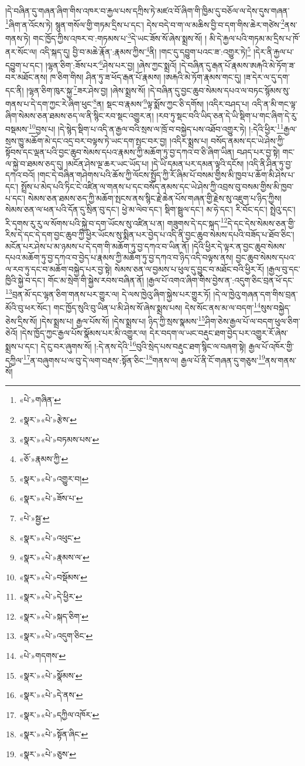 །དེ་བཞིན་དུ་གཞན་ཞིག་གིས་འཁར་བ་རྐྱལ་པས་དཀྲིས་ཏེ་མཛའ་བོ་ཞིག་གི་ཁྱིམ་དུ་བཅོལ་ལ་དེས་དུས་གཞན་\footnote{«པེ་»གཞིན་}ཞིག་ན་འོངས་ཏེ། སྙུན་གསོལ་གྱི་གཏམ་དྲིས་པ་དང་། དེས་བདེ་བ་ག་ལ་མཆིས་བྱི་བ་དག་གིས་ཆེར་གཙེས་\footnote{«སྣར་»«པེ་»རྩེས་}ནས་གནས་ཏེ། གང་ཁྱོད་ཀྱིས་འཁར་བ་:གཏམས་པ་\footnote{«སྣར་»«པེ་»བཏམས་པས་}དེ་ཡང་ཟོས་སོ་ཞེས་སྨྲས་སོ། །
མི་དེ་རྐྱལ་པའི་གཏམ་མ་དྲིས་པ་ཁོ་ནར་སོང་ལ། འདི་སྐད་དུ། བྱི་བ་མཆེ་རྣོན་:རྣམས་ཀྱིས་\footnote{«ཅོ་»རྣམས་ཀྱི་}ནི། །གང་དུ་དབྱུག་པའང་ཟ་:འགྱུར་ཏེ།\footnote{«སྣར་»«པེ་»འགྱུར་བ།} །དེར་ནི་རྐྱལ་པ་དབྱུག་པ་དང་། །ལྷན་ཅིག་:ཟོས་པར་\footnote{«སྣར་»«པེ་»ཟོས་པ་}ཤེས་པར་བྱ། །ཞེས་ཀྱང་སྨྲའོ། །དེ་བཞིན་དུ་རྒན་པོ་རྣམས་ཨརྐའི་མེ་ཏོག་ཟ་བར་མཐོང་ནས། ཁ་ཅིག་གིས། ཤིན་ཏུ་ཟ་ཕོད་རྒན་པོ་རྣམས། །ཨརྐའི་མེ་ཏོག་རྣམས་གང་དུ། །ཟ་དེར་ལ་དུ་དག་དང་ནི། །ལྷན་ཅིག་ཁུར་སྐྱ་\footnote{«པེ་»སྦྱ་}ཟར་ཤེས་བྱ། །ཞེས་སྨྲས་སོ། །དེ་བཞིན་དུ་བྱང་ཆུབ་སེམས་དཔའ་ལ་བཏང་སྙོམས་སུ་གནས་པ་དེ་དག་ཀྱང་རེ་ཞིག་ཕུང་\footnote{«སྣར་»«པེ་»འཕུང་}ན། སྡང་བ་རྣམས་\footnote{«སྣར་»«པེ་»རྣམས་ལ་}ལྟ་སྨོས་ཀྱང་ཅི་དགོས། །འདིར་བཤད་པ། འདི་ན་མི་གང་ལྟ་ཞིག་སེམས་ཅན་ཐམས་ཅད་ལ་ནི་སྙིང་རབ་སྡང་འགྱུར་ན། །རབ་ཏུ་སྡང་བའི་ཡིད་ཅན་དེ་ཡི་སྡིག་པ་གང་ཞིག་དེ་རུ་བསྡམས་\footnote{«སྣར་»«པེ་»བསྡོམས་}བྱས་པ། །དེ་སྙེད་སྡིག་པ་འདི་ན་རྒྱལ་བའི་སྲས་ལ་ཁྲོ་བ་བསྐྱེད་པས་འཐོབ་འགྱུར་ཏེ། །:དེའི་ཕྱིར་\footnote{«སྣར་»«པེ་»དེ་ཕྱིར་}རྒྱལ་སྲས་ཁྱུ་མཆོག་མེ་དང་འདྲ་བར་བལྟས་ཏེ་ཡང་དག་སྤང་བར་བྱ། །འདིར་སྨྲས་པ། བསོད་ནམས་དང་ཡེ་ཤེས་ཀྱི་སྟོབས་དང་ལྡན་པའི་བྱང་ཆུབ་སེམས་དཔའ་རྣམས་ཀྱི་མཆོག་ཏུ་བྱ་དཀའ་བ་ཅི་ཞིག་ཡིན། བཤད་པར་བྱ་སྟེ། གང་ལ་སྐྱེ་བ་ཐམས་ཅད་དུ། །མངོན་ཤེས་ལྔ་ཆར་ཡང་ཡོད་པ། །དེ་ཡི་དམན་པར་དམན་ལྟའི་དངོས། །འདི་ནི་ཤིན་ཏུ་བྱ་དཀའ་བའོ། །གང་དེ་བཞིན་གཤེགས་པའི་ཆོས་ཀྱི་ལོངས་སྤྱོད་ཀྱི་རོ་ཞིམ་པོ་བསམ་གྱིས་མི་ཁྱབ་པ་ཆོག་མི་ཤེས་པ་དང་། སྤྲོས་པ་མེད་པའི་ཏིང་ངེ་འཛིན་ལ་གནས་པ་དང་བསོད་ནམས་དང་ཡེ་ཤེས་ཀྱི་འབྲས་བུ་བསམ་གྱིས་མི་ཁྱབ་པ་དང་། སེམས་ཅན་ཐམས་ཅད་ཀྱི་མཆོག་སྤངས་ནས་སྙིང་རྗེ་ཆེན་པོས་གཞན་གྱི་རྗེས་སུ་འཇུག་པ་ཉིད་ཀྱིས། སེམས་ཅན་ལ་ཕན་པའི་དོན་དུ་སྲིན་བུ་དང་། ཕྱེ་མ་ལེབ་དང་། སྡིག་སྦྲུལ་དང་། མ་ཧེ་དང་། རི་བོང་དང་། སྤྲེའུ་དང་། རི་དྭགས་རུ་རུ་ལ་སོགས་པའི་སྐྱེ་བ་དག་ཡོངས་སུ་འཛིན་པ་ན། གཟུགས་དེ་དང་སྐད་\footnote{«སྣར་»«པེ་»སྐད་ཅིག་}དེ་དང་དེས་སེམས་ཅན་གྱི་རིས་དེ་དང་དེ་དག་བྱང་ཆུབ་ཀྱི་ཕྱིར་ཡོངས་སུ་སྨིན་པར་བྱེད་པ་འདི་ནི་བྱང་ཆུབ་སེམས་དཔའི་བཟོད་པ་ཐོབ་ཅིང་། མངོན་པར་ཤེས་པ་མ་ཉམས་པ་དེ་དག་གི་མཆོག་ཏུ་བྱ་དཀའ་བ་ཡིན་ནོ། །དེའི་ཕྱིར་དེ་ལྟར་ན་བྱང་ཆུབ་སེམས་དཔའ་མཆོག་ཏུ་བྱ་དཀའ་བ་བྱེད་པ་རྣམས་ཀྱི་མཆོག་ཏུ་བྱ་དཀའ་བ་ཉིད་འདི་བལྟས་ནས། བྱང་ཆུབ་སེམས་དཔའ་ལ་རབ་ཏུ་དང་བ་མཆོག་བསྐྱེད་པར་བྱ་སྟེ། སེམས་ཅན་ལ་བྱམས་པ་ཕུལ་དུ་བྱུང་བ་མཐོང་བའི་ཕྱིར་རོ། །རྒྱལ་བུ་དང་ཁྱིའི་སྐྱེ་བ་དང་། གོང་མ་སྲེག་གི་སྐྱེས་རབས་བཞིན་ནོ། །རྒྱལ་པོ་འགའ་ཞིག་གིས་བྱེས་ན་:འདུག་ཅིང་བྲན་ཕོ་དང་\footnote{«སྣར་»«པེ་»འདུག་ཅིང་}བྲན་མོ་དང་ལྷན་ཅིག་གནས་པར་གྱུར་ལ། དེ་ལས་ཁྱེའུ་ཞིག་སྐྱེས་པར་གྱུར་ཏོ། །དེ་ལ་ཁྱེའུ་གཞན་དག་གིས་བྲན་མོའི་བུ་ཕར་སོང་། གང་ཁྱོད་སུའི་བུ་ཡིན་པ་མི་ཤེས་སོ་ཞེས་སྨྲས་པས། དེས་སོང་ནས་མ་ལ་བདག་\footnote{«པེ་»གདགས་}སུས་བསྐྱེད་ཅེས་དྲིས་སོ། །དེས་སྨྲས་པ། རྒྱལ་པོས་སོ། །དེས་སྨྲས་པ། ཉིད་ཀྱི་སྲས་སྣམས་\footnote{«སྣར་»«པེ་»སྣོམས་}ཤིག་ཅེས་རྒྱལ་པོ་ལ་བདག་ཕུལ་ཅིག་ཅེའོ། །དེས་ཁྱོད་ཀྱང་རྒྱལ་པོས་སྣོམས་པར་མི་འགྱུར་ལ། དེར་བདག་ལ་ཡང་བརྡུང་ཐག་བྱེད་པར་འགྱུར་རོ་ཞེས་སྨྲས་པ་དང་། དེ་ངུ་བར་ཞུགས་སོ། །:དེ་ནས་དེའི་\footnote{«སྣར་»«པེ་»དེ་ནས་}བུའི་སྲེད་པས་བརྡུང་ཐག་སྙིང་ལ་བཞག་སྟེ། རྒྱལ་པོ་འཁོར་གྱི་དཀྱིལ་\footnote{«སྣར་»«པེ་»དཀྱིལ་འཁོར་}ན་བཞུགས་པ་ལ་བུ་དེ་ལག་བརྡས་:སྟོན་ཅིང་\footnote{«སྣར་»«པེ་»སྟོན་ཞིང་}གནས་ལ། རྒྱལ་པོ་ནི་ངོ་གཞན་དུ་གཅུས་\footnote{«སྣར་»«པེ་»ཅུས་}ནས་གནས་སོ། 